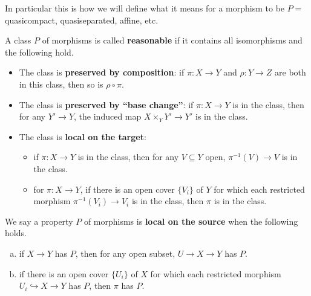 \documentclass[12pt]{article}
\begin{document}
In particular this is how we will define what it means for a morphism to be $P=$ quasicompact, quasiseparated, affine, etc.

\begin{defn}
    A class $P$ of morphisms is called \textbf{reasonable} if it contains all isomorphisms and the following hold.
    \begin{itemize}[(i)]
        \item The class is \textbf{preserved by composition}: if $\pi:X\to Y$ and $\rho:Y\to Z$ are both in this class, then so is $\rho\circ\pi$.
        \item The class is \textbf{preserved by ``base change''}: if $\pi:X\to Y$ is in the class, then for any $Y'\to Y$, the induced map $X\times_Y Y'\to Y'$ is in the class.
        \item The class is \textbf{local on the target}:
        \begin{itemize}[(a)]
            \item if $\pi:X\to Y$ is in the class, then for any $V\subseteq Y$ open, $\pi^{-1}(V)\to V$ is in the class.
            \item for $\pi:X\to Y$, if there is an open cover $\{V_i\}$ of $Y$ for which each restricted morphism $\pi^{-1}(V_i)\to V_i$ is in the class, then $\pi$ is in the class.
        \end{itemize}
    \end{itemize}
\end{defn}

\begin{defn}
    We say a property $P$ of morphisms is \textbf{local on the source} when the following holds.
    \begin{enumerate}[(a)]
        \item if $X\to Y$ has $P$, then for any open subset, $U\to X \to Y$ has $P$.
        \item if there is an open cover $\{U_i\}$ of $X$ for which each restricted morphism $U_i\hookrightarrow X\to Y$ has $P$, then $\pi$ has $P$.
    \end{enumerate}
\end{defn}
\end{document}
